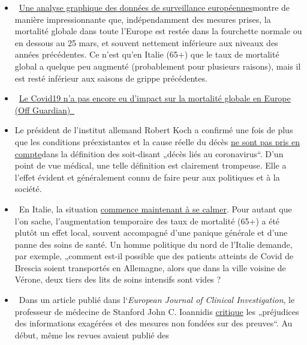 \begin{itemize}
\tightlist
\item
  ~\href{https://off-guardian.org/2020/03/30/covid19-yet-to-impact-europes-overall-mortality/}{Une
  analyse graphique des données de surveillance européennes}montre de
  manière impressionnante que, indépendamment des mesures prises, la
  mortalité globale dans toute l'Europe est restée dans la fourchette
  normale ou en dessous au 25 mars, et souvent nettement inférieure aux
  niveaux des années précédentes. Ce n'est qu'en Italie (65+) que le
  taux de mortalité global a quelque peu augmenté (probablement pour
  plusieurs raisons), mais il est resté inférieur aux saisons de grippe
  précédentes.
\item
  ~\href{http://le-blog-sam-la-touch.over-blog.com/2020/03/le-covid19-n-a-pas-encore-eu-d-impact-sur-la-mortalite-globale-en-europe-off-guardian.html}{Le
  Covid19 n'a pas encore eu d'impact sur la mortalité globale en Europe
  (Off Guardian)~}
\item
  Le président de l'institut allemand Robert Koch a confirmé une fois de
  plus que les conditions préexistantes et la cause réelle du décès
  \href{https://swprs.org/rki-relativiert-corona-todesfaelle/}{ne sont
  pas pris en compte}dans la définition des soit-disant „décès liés au
  coronavirus``. D'un point de vue médical, une telle définition est
  clairement trompeuse. Elle a l'effet évident et généralement connu de
  faire peur aux politiques et à la société.
\item
  ~En Italie, la situation
  \href{https://www.tagesspiegel.de/politik/die-verlangsamung-ist-da-in-italien-zeichnet-sich-die-wende-in-der-coronakrise-ab/25698124.html}{commence
  maintenant à se calmer}. Pour autant que l'on sache, l'augmentation
  temporaire des taux de mortalité (65+) a été plutôt un effet local,
  souvent accompagné d'une panique générale et d'une panne des soins de
  santé. Un homme politique du nord de l'Italie demande, par exemple,
  „comment est-il possible que des patients atteints de Covid de Brescia
  soient transportés en Allemagne, alors que dans la ville voisine de
  Vérone, deux tiers des lits de soins intensifs sont vides ?
\item
  ~Dans un article publié dans l`\emph{European Journal of Clinical
  Investigation}, le professeur de médecine de Stanford John C.
  Ioannidis
  \href{https://onlinelibrary.wiley.com/doi/abs/10.1111/eci.13222}{critique}
  les „préjudices des informations exagérées et des mesures non fondées
  sur des preuves``. Au début, même les revues avaient publié des

\end{itemize}
